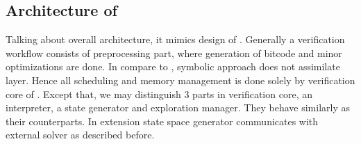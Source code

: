 
\subsection{Architecture of \SymDIVINE}
Talking about \SymDIVINE overall architecture, it mimics design of \DIVINE.
Generally a verification workflow consists of preprocessing part, where
generation of \LLVM bitcode and minor optimizations are done. In compare to
\DIVINE, symbolic approach does not assimilate \DIOS layer. Hence all scheduling
and memory management is done solely by verification core of \SymDIVINE. Except
that, we may distinguish 3 parts in verification core, an interpreter, a state
generator and exploration manager. They behave similarly as their \DIVINE
counterparts. In extension state space generator communicates with external
\SMT solver as described before.

